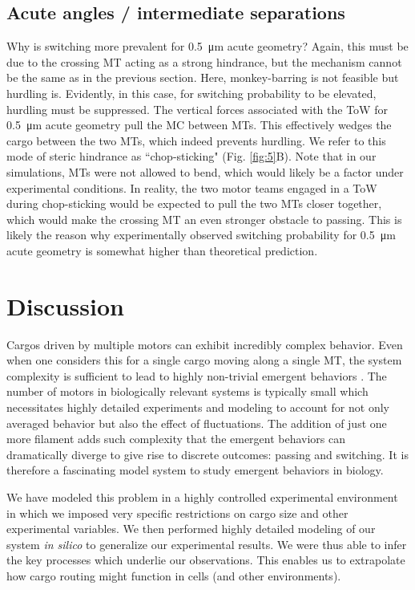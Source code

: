 \subsection{Acute angles / intermediate separations}

Why is switching more prevalent for \SI{.5}{\micro\meter} acute geometry? Again, this must be due to the crossing MT acting as a strong hindrance, but the mechanism cannot be the same as in the previous section. Here, monkey-barring is not feasible but hurdling is. Evidently, in this case, for switching probability to be elevated, hurdling must be suppressed. The vertical forces associated with the ToW for \SI{.5}{\micro\meter} acute geometry pull the MC between MTs. This effectively wedges the cargo between the two MTs, which indeed prevents hurdling. We refer to this mode of steric hindrance as ``chop-sticking" (Fig. \ref{fig:5}B). Note that in our simulations, MTs were not allowed to bend, which would likely be a factor under experimental conditions. In reality, the two motor teams engaged in a ToW during chop-sticking would be expected to pull the two MTs closer together, which would make the crossing MT an even stronger obstacle to passing. This is likely the reason why experimentally observed switching probability for \SI{.5}{\micro\meter} acute geometry is somewhat higher than theoretical prediction.

\section{Discussion}

Cargos driven by multiple motors can exhibit incredibly complex behavior. Even when one considers this for a single cargo moving along a single MT, the system complexity is sufficient to lead to highly non-trivial emergent behaviors \cite{Kunwar2008,Jamison2010}. The number of motors in biologically relevant systems is typically small which necessitates highly detailed experiments and modeling to account for not only averaged behavior but also the effect of fluctuations. The addition of just one more filament adds such complexity that the emergent behaviors can dramatically diverge to give rise to discrete outcomes: passing and switching. It is therefore a fascinating model system to study emergent behaviors in biology.

We have modeled this problem in a highly controlled experimental environment in which we imposed very specific restrictions on cargo size and other experimental variables. We then performed highly detailed modeling of our system \textit{in silico} to generalize our experimental results. We were thus able to infer the key processes which underlie our observations. This enables us to extrapolate how cargo routing might function in cells (and other environments).

